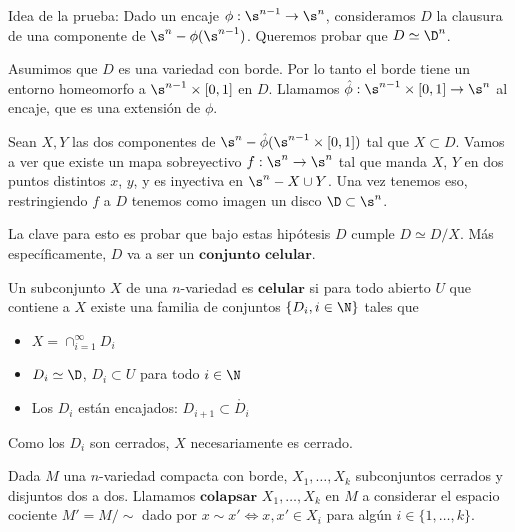 
Idea de la prueba: Dado un encaje $\phi:\s^{n-1}\to\s^n$, consideramos $D$ la clausura de una componente de $\s^n - \phi(\s^{n-1})$. Queremos probar que $D\simeq \D^n$.

Asumimos que $D$ es una variedad con borde. Por lo tanto el borde tiene un entorno homeomorfo a $\s^{n-1}\times [0,1]$ en $D$.  Llamamos $\hat{\phi}:\s^{n-1}\times [0,1]\to\s^n$ al encaje, que es una extensión de $\phi$.

Sean $X, Y$ las dos componentes de $\s^n-\hat{\phi}(\s^{n-1}\times [0,1])$ tal que $X\subset D$. Vamos a ver que existe un mapa sobreyectivo $f:\s^n\to\s^n$ tal que manda $X$, $Y$ en dos puntos distintos $x$, $y$, y es inyectiva en $\s^n-X\cup Y$. Una vez tenemos eso, restringiendo $f$ a $D$ tenemos como imagen un disco $\D\subset\s^n$.

La clave para esto es probar que bajo estas hipótesis $D$ cumple $D\simeq D/X$. Más específicamente, $D$ va a ser un $\textbf{conjunto celular}$.

\begin{df}
    Un subconjunto $X$ de una $n$-variedad es $\textbf{celular}$ si para todo abierto $U$ que contiene a $X$ existe una familia de conjuntos $\{D_i,i\in\N\}$ tales que 
    
    \begin{itemize}
        \item $X=\cap_{i=1}^\infty D_i$
        \item $D_i\simeq\D$, $D_i\subset U$ para todo $i\in\N$
        \item Los $D_i$ están encajados: $D_{i+1}\subset\mathring{D_i}$
    \end{itemize}
\end{df}

\begin{obs}
    Como los $D_i$ son cerrados, $X$ necesariamente es cerrado.
\end{obs}

\begin{df}

    Dada $M$ una $n$-variedad compacta con borde, $X_1,\dots,X_k$ subconjuntos cerrados y disjuntos dos a dos. Llamamos $\textbf{colapsar}$ $X_1,\dots ,X_k$ en $M$ a considerar el espacio cociente $M'=M/ \sim $ dado por $x\sim x'\iff x,x'\in X_i$ para algún $i\in\{1,\dots,k\}$.

\end{df}

